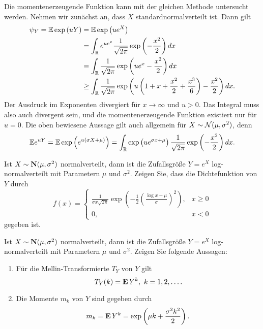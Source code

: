 Die momentenerzeugende Funktion kann mit der gleichen Methode untersucht werden. 
Nehmen wir zunächst an, dass $X$ standardnormalverteilt ist. Dann gilt
\begin{align*}
    \psi_Y = \mathbb{E} \exp \left( uY \right) &= \mathbb{E} \exp \left( u e^{X} \right) \\
    &= \int_{\mathbb{R}} e^{u e^{x}} \frac{1}{\sqrt{ 2 \pi}} \exp \left(  - \frac{x^2}{2}  \right) dx \\
    &= \int_{\mathbb{R}} \frac{1}{\sqrt{2 \pi}} \exp \left(u e^{x} - \frac{x^2}{2} \right)dx \\
    & \geq \int_{\mathbb{R}}^{} \frac{1}{\sqrt{2\pi}} 
    \exp \left( u\left(1 + x + \frac{x^2}{2} + \frac{x^3}{6}\right) - \frac{x^2}{2} \right) dx.
\end{align*}
Der Ausdruck im Exponenten divergiert für $x\to \infty$ und $u>0$. Das Integral muss 
also auch divergent sein, und die momentenerzeugende Funktion existiert nur für $u=0$. 
Die oben bewiesene Aussage gilt auch allgemein für $X \sim \mathcal N (\mu, \sigma^2)$, denn
\begin{equation*}
    \mathbb{E} e^{uY} = \mathbb{E} \exp \left( e^{u (\sigma X + \mu)} \right) = 
    \int_{\mathbb{R}} \exp \left( u e^{\sigma x + \mu} \right) \frac{1}{\sqrt{2\pi}}
    \exp \left( -\frac{x^2}{2} \right) dx. 
\end{equation*}


 Ist $X\sim\mathbf N(\mu,
\sigma^2)$ normalverteilt, dann ist die Zufallsgröße $Y=e^{X}$
log-normalverteilt mit Parametern $\mu$ und $\sigma^{2}$. Zeigen Sie, dass die
Dichtefunktion von $Y$ durch
\begin{equation*}
    f(x) = 
    \begin{cases}
        \frac{1}{\sigma x \sqrt{2\pi}} \exp \left( -\frac{1}{2} \left( \frac{\log x -\mu}{\sigma} \right)^2  \right), & x\geq 0 \\
        0, & x<0
    \end{cases}
\end{equation*} 
gegeben ist.


 Ist $X\sim\mathbf N(\mu, \sigma^2)$
normalverteilt, dann ist die Zufallsgröße $Y=e^{X}$ log-normalverteilt mit
Parametern $\mu$ und $\sigma^{2}$. Zeigen Sie folgende Aussagen: 
\begin{enumerate}
    \item Für die Mellin-Transformierte $T_{Y}$ von $Y$ gilt
        \begin{equation*}
            T_{Y}(k) =  \bfE \, Y^{k}, \ k=1,2,\dots.
        \end{equation*}

    \item Die Momente $m_k$ von $Y$ sind gegeben durch
        \begin{equation*}
            m_{k} = \mathbf E \, Y^{k} = \exp \left( \mu k + \frac{ \sigma^2 k^{2}}{2} \right).
        \end{equation*}
\end{enumerate}


